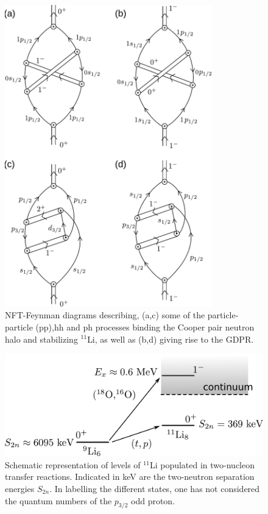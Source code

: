 \begin{subappendices}
\begin{figure}
\includegraphics[width=0.8\textwidth]{C8/figsC8/Nobel40Years-4b.pdf}
\caption{NFT-Feynman diagrams describing, (a,c) some of the particle-particle (pp),hh and ph processes binding the Cooper pair neutron halo 
and stabilizing $^{11}$Li, as well as  (b,d) giving rise to the GDPR.}
\end{figure}\label{fig6.I.2}

\begin{figure}
\includegraphics[width=\textwidth]{C8/figsC8/figa3_newnew.pdf}
\caption{ Schematic representation of levels of $^{11}$Li populated in two-nucleon transfer reactions. Indicated in keV are the two-neutron
separation energies $S_{2n}$. In labelling the different states, one has not considered the quantum numbers of the $p_{3/2}$ odd proton. }\label{fig6.I.3} 
\end{figure}


\end{subappendices}
